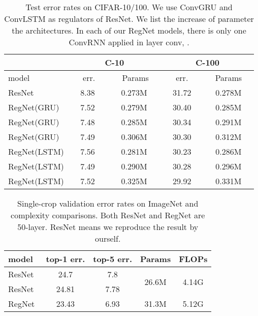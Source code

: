 \documentclass[journal,comsoc]{IEEEtran}
\begin{document}
\begin{table}[t]
\caption{Test error rates on CIFAR-10/100. We use ConvGRU and ConvLSTM as regulators of ResNet. We list the increase of parameter the architectures. In each of our RegNet models, there is only one ConvRNN applied in layer conv, . }
\begin{center}
\begin{tabular}{l|c|c|c|c}
\hline
 & \multicolumn{2}{c}{C-10} & \multicolumn{2}{|c}{C-100}\\ \hline
model  &~~ err.~~ &~~ Params~~ &~~ err. ~~& ~~Params~~\\
\hline\hline
ResNet~\cite{DBLP:journals/corr/HeZRS15}   &   8.38   & 0.273M   & 31.72  & 0.278M  \\ \hline
              
RegNet(GRU) & 7.52 & 0.279M  & 30.40 & 0.285M     \\ \hline

RegNet(GRU) & 7.48 &   0.285M      & 30.34  &  0.291M    \\ \hline

RegNet(GRU)  & 7.49 &   0.306M     & 30.30  &  0.312M  \\ \hline

RegNet(LSTM)  & 7.56 & 0.281M & 30.23 &  0.286M    \\ \hline

RegNet(LSTM)  &   7.49   & 0.290M  & 30.28 & 0.296M    \\ \hline

RegNet(LSTM)  &   7.52   & 0.325M  & 29.92  & 0.331M    \\ \hline

\end{tabular}
\end{center}
\label{table:rnn_pos}
\end{table}









\begin{table}[t]
\caption{Single-crop validation error rates on ImageNet and complexity comparisons. Both ResNet and RegNet are 50-layer. ResNet means we reproduce the result by ourself. }
\begin{center}
\begin{tabular}{l|c|c|c|c}
\hline

model &  top-1 err. & top-5 err. &Params &FLOPs\\
\hline\hline
ResNet~\cite{DBLP:journals/corr/HeZRS15}  & 24.7 & 7.8 & \multirow{2}{*}{26.6M} & \multirow{2}{*}{4.14G}\\
\cline{1-3}
ResNet& 24.81 & 7.78 &  &       \\ \hline
RegNet & 23.43 &6.93&31.3M &5.12G     \\ \hline

\end{tabular}
\end{center}
\label{table:imagenet_para}
\end{table}
\end{document}
